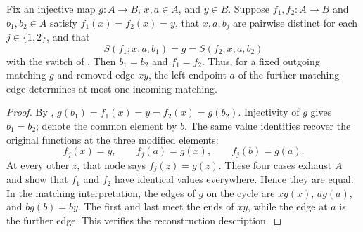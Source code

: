 \begin{lemma}
Fix an injective map $g:A\to B$, $x,a\in A$, and $y\in B$.
Suppose $f_1,f_2:A\to B$ and $b_1,b_2\in A$ satisfy
$f_1(x)=f_2(x)=y$, that $x,a,b_j$ are pairwise distinct for each
$j\in\{1,2\}$, and that
\[
 S(f_1;x,a,b_1)=g=S(f_2;x,a,b_2)
\]
with the switch of .
Then $b_1=b_2$ and $f_1=f_2$. Thus, for a fixed outgoing matching $g$
and removed edge $xy$, the left endpoint $a$ of the further matching
edge determines at most one incoming matching.
\end{lemma}
\begin{proof}
By ,
$g(b_1)=f_1(x)=y=f_2(x)=g(b_2)$. Injectivity of $g$ gives
$b_1=b_2$; denote the common element by $b$.
The same value identities recover the original functions at the
three modified elements:
\[
 f_j(x)=y,\qquad f_j(a)=g(x),\qquad f_j(b)=g(a).
\]
At every other $z$, that node says $f_j(z)=g(z)$.
These four cases exhaust $A$ and show that $f_1$ and $f_2$ have
identical values everywhere. Hence they are equal.
In the matching interpretation, the edges of $g$ on the cycle are
$xg(x)$, $ag(a)$, and $bg(b)=by$. The first and last meet the ends
of $xy$, while the edge at $a$ is the further edge. This verifies
the reconstruction description.
\end{proof}
